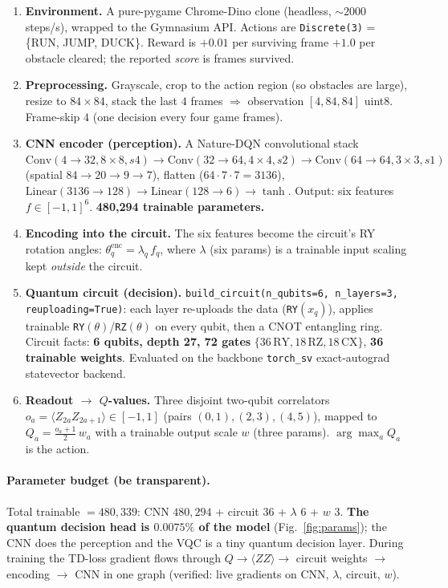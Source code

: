 \documentclass[10pt]{article}
\begin{document}
\begin{enumerate}\itemsep2pt
\item \textbf{Environment.} A pure-pygame Chrome-Dino clone (headless, ${\sim}2000$ steps/s), wrapped to the
Gymnasium API. Actions are \texttt{Discrete(3)} = \{RUN, JUMP, DUCK\}. Reward is $+0.01$ per surviving frame
$+1.0$ per obstacle cleared; the reported \emph{score} is frames survived.
\item \textbf{Preprocessing.} Grayscale, crop to the action region (so obstacles are large), resize to
$84\times84$, stack the last $4$ frames $\Rightarrow$ observation $[4,84,84]$ uint8. Frame-skip $4$ (one
decision every four game frames).
\item \textbf{CNN encoder (perception).} A Nature-DQN convolutional stack
$\text{Conv}(4{\to}32,8{\times}8,s4)\to\text{Conv}(32{\to}64,4{\times}4,s2)\to\text{Conv}(64{\to}64,3{\times}3,s1)$
(spatial $84{\to}20{\to}9{\to}7$), flatten ($64\cdot7\cdot7=3136$), $\text{Linear}(3136{\to}128)\to
\text{Linear}(128{\to}6)\to\tanh$. Output: six features $f\in[-1,1]^6$. \textbf{480{,}294 trainable
parameters.}
\item \textbf{Encoding into the circuit.} The six features become the circuit's RY rotation angles:
$\theta^{\text{enc}}_q=\lambda_q\, f_q$, where $\lambda$ (six params) is a trainable input scaling kept
\emph{outside} the circuit.
\item \textbf{Quantum circuit (decision).} \texttt{build\_circuit(n\_qubits=6, n\_layers=3,
reuploading=True)}: each layer re-uploads the data (\texttt{RY}$(x_q)$), applies trainable
\texttt{RY}$(\theta)$/\texttt{RZ}$(\theta)$ on every qubit, then a CNOT entangling ring. Circuit facts:
\textbf{6 qubits, depth 27, 72 gates} $\{36\,\text{RY}, 18\,\text{RZ}, 18\,\text{CX}\}$, \textbf{36 trainable
weights}. Evaluated on the backbone \texttt{torch\_sv} exact-autograd statevector backend.
\item \textbf{Readout $\to$ $Q$-values.} Three disjoint two-qubit correlators
$o_a=\langle Z_{2a}Z_{2a+1}\rangle\in[-1,1]$ (pairs $(0,1),(2,3),(4,5)$), mapped to
$Q_a=\tfrac{o_a+1}{2}\,w_a$ with a trainable output scale $w$ (three params). $\arg\max_a Q_a$ is the action.
\end{enumerate}

\paragraph{Parameter budget (be transparent).} Total trainable $=480{,}339$:
CNN $480{,}294$ + circuit $36$ + $\lambda$ $6$ + $w$ $3$. \textbf{The quantum decision head is
$0.0075\%$ of the model} (Fig.~\ref{fig:params}); the CNN does the perception and the VQC is a tiny quantum
decision layer. During training the TD-loss gradient flows through $Q\to\langle ZZ\rangle\to$ circuit
weights $\to$ encoding $\to$ CNN in one graph (verified: live gradients on CNN, $\lambda$, circuit, $w$).
\end{document}
